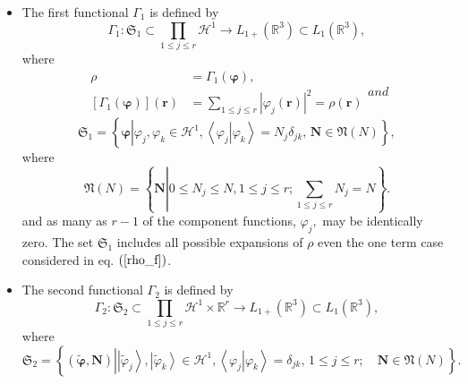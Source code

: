 \documentclass[aps,preprint]{revtex4}%
\begin{document}
\begin{itemize}
\item The first functional $\Gamma_{1}$ is defined by
\begin{equation}
\Gamma_{1}:\mathfrak{S}_{1}\subset\prod\limits_{1\leq j\leq r}\mathcal{H}%
^{1}\rightarrow L_{1+}\left(  \mathbb{R}^{3}\right)  \subset L_{1}\left(
\mathbb{R}^{3}\right)  ,
\end{equation}
where
\begin{subequations}
\label{GammaAll}%
\begin{align}
\rho &  =\Gamma_{1}\left(  \boldsymbol{\varphi}\right)  ,\\
\left[  \Gamma_{1}\left(  \boldsymbol{\varphi}\right)  \right]  \left(
\boldsymbol{r}\right)   &  =\sum_{1\leq j\leq r}\left\vert \varphi_{j}\left(
\boldsymbol{r}\right)  \right\vert ^{2}=\rho\left(  \boldsymbol{r}\right)
\label{Gamma}%
\end{align}
and%
\end{subequations}
\begin{equation}
\mathfrak{S}_{1}=\left\{  \boldsymbol{\varphi}\left\vert \varphi_{j}%
,\varphi_{k}\in\mathcal{H}^{1},\left\langle \left.  \varphi_{j}\right\vert
\varphi_{k}\right\rangle =N_{j}\delta_{jk},\,\boldsymbol{N}\in\mathfrak{N}%
\left(  N\right)  \right.  \right\}  , \label{set1}%
\end{equation}
where
\begin{equation}
\mathfrak{N}\left(  N\right)  =\left\{  \boldsymbol{N}\left\vert 0\leq
N_{j}\leq N,1\leq j\leq r;\sum_{1\leq j\leq r}N_{j}=N\right.  \right\}  .
\end{equation}
and as many as $r-1$ of the component functions, $\varphi_{j},$ may be
identically zero. The set $\mathfrak{S}_{1}$ includes all possible expansions
of $\rho$ even the one term case considered in eq. $\left(  \ref{rho_f}%
\right)  $.

\item The second functional $\Gamma_{2}$ is defined by
\begin{equation}
\Gamma_{2}:\mathfrak{S}_{2}\subset\prod\limits_{1\leq j\leq r}\mathcal{H}%
^{1}\times\mathbb{R}^{r}\rightarrow L_{1+}\left(  \mathbb{R}^{3}\right)
\subset L_{1}\left(  \mathbb{R}^{3}\right)  ,
\end{equation}
where
\begin{equation}
\mathfrak{S}_{2}=\left\{  \left(  \boldsymbol{\tilde{\varphi},N}\right)
\left\vert \left\vert \tilde{\varphi}_{j}\right\rangle ,\left\vert
\tilde{\varphi}_{k}\right\rangle \in\mathcal{H}^{1},\left\langle \left.
\varphi_{j}\right\vert \varphi_{k}\right\rangle =\delta_{jk},\,1\leq j\leq
r;\quad\boldsymbol{N}\in\mathfrak{N}\left(  N\right)  \right.  \right\}  .
\label{set2}%
\end{equation}



\end{itemize}
\end{document}
